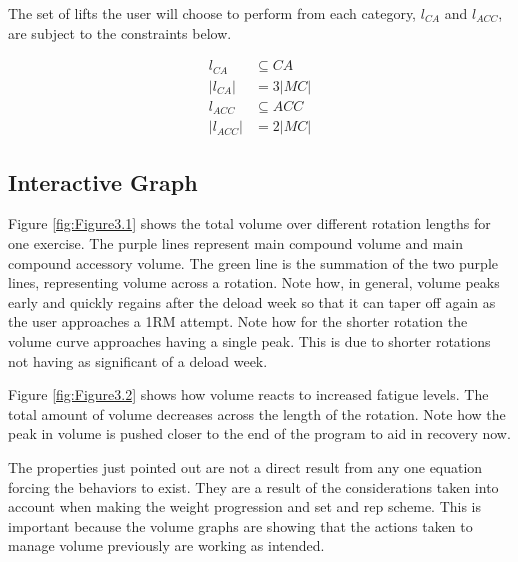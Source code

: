The set of lifts the user will choose to perform from each category, $l_{CA}$ and $l_{ACC}$, are subject to the constraints below.

\begin{equation}
    \begin{split}
            l_{CA} &\subseteq CA\\
            \left| l_{CA} \right| &= 3\left| MC \right|\\
            l_{ACC} &\subseteq ACC\\
            \left| l_{ACC} \right| &= 2\left| MC \right|
    \end{split}
\end{equation}


\subsection{Interactive Graph}

Figure \ref{fig:Figure3.1} shows the total volume over different rotation lengths for one exercise. The purple lines represent main compound volume and main compound accessory volume. The green line is the summation of the two purple lines, representing volume across a rotation. Note how, in general, volume peaks early and quickly regains after the deload week so that it can taper off again as the user approaches a 1RM attempt. Note how for the shorter rotation the volume curve approaches having a single peak. This is due to shorter rotations not having as significant of a deload week.

Figure \ref{fig:Figure3.2} shows how volume reacts to increased fatigue levels. The total amount of volume decreases across the length of the rotation. Note how the peak in volume is pushed closer to the end of the program to aid in recovery now.

The properties just pointed out are not a direct result from any one equation forcing the behaviors to exist. They are a result of the considerations taken into account when making the weight progression and set and rep scheme. This is important because the volume graphs are showing that the actions taken to manage volume previously are working as intended.

